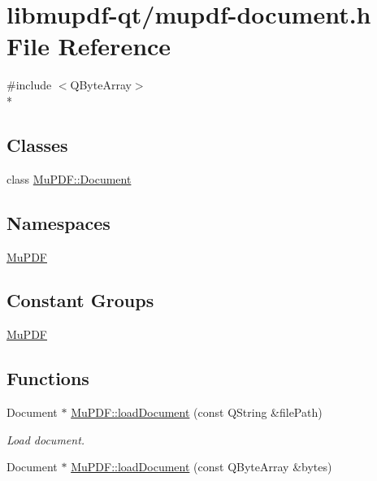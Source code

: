 \hypertarget{mupdf-document_8h}{\section{libmupdf-\/qt/mupdf-\/document.h File Reference}
\label{mupdf-document_8h}
}
{\ttfamily \#include $<$Q\-Byte\-Array$>$}\\*
\subsection*{Classes}
\begin{DoxyCompactItemize}
\item 
class \hyperlink{class_mu_p_d_f_1_1_document}{Mu\-P\-D\-F\-::\-Document}
\end{DoxyCompactItemize}
\subsection*{Namespaces}
\begin{DoxyCompactItemize}
\item 
\hyperlink{namespace_mu_p_d_f}{Mu\-P\-D\-F}
\end{DoxyCompactItemize}
\subsection*{Constant Groups}
\begin{DoxyCompactItemize}
\item 
\hyperlink{namespace_mu_p_d_f}{Mu\-P\-D\-F}
\end{DoxyCompactItemize}
\subsection*{Functions}
\begin{DoxyCompactItemize}
\item 
Document $\ast$ \hyperlink{namespace_mu_p_d_f_a5cf746094bc9648aca0d4a83e3ac44b3}{Mu\-P\-D\-F\-::load\-Document} (const Q\-String \&file\-Path)
\begin{DoxyCompactList}\small\item\em Load document. \end{DoxyCompactList}\item 
Document $\ast$ \hyperlink{namespace_mu_p_d_f_a294a09188a3dcab290679752dfc8d52b}{Mu\-P\-D\-F\-::load\-Document} (const Q\-Byte\-Array \&bytes)
\end{DoxyCompactItemize}
